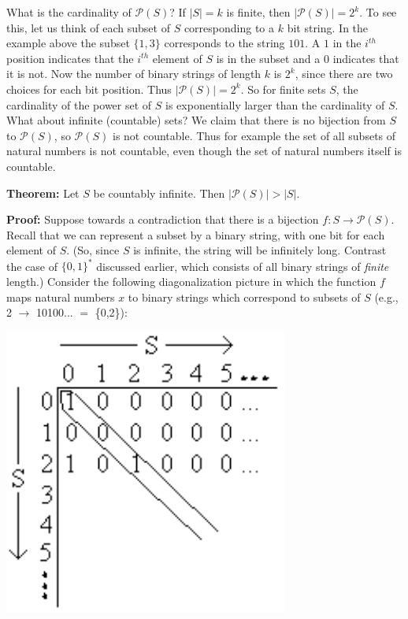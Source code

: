 \documentclass[11pt,fleqn]{article}
\begin{document}
What is the cardinality of $\mathcal{P}(S)$? If $|S|=k$ is finite, 
then $|\mathcal{P}(S)| = 2^k$.
To see this, let us think of each subset of $S$ corresponding to a $k$ bit string. In the 
example above the subset $\{1,3\}$ corresponds to the string $101$. 
A $1$ in the $i^{th}$ position indicates that the $i^{th}$ element 
of $S$ is in the subset and a $0$ indicates that it is not. 
Now the number of binary strings of length $k$ is $2^k$, since 
there are two choices for each bit position. 
Thus $|\mathcal{P}(S)| = 2^{k}$. So for finite sets $S$, the cardinality of 
the power set of $S$ is exponentially larger than the cardinality of $S$. What about 
infinite (countable) sets? We claim that
there is no bijection from $S$ to $\mathcal{P}(S)$, so $\mathcal{P}(S)$ is
not countable.  Thus for example the set of all subsets of natural numbers
is not countable, even though the set of natural numbers itself is countable.

\textbf{Theorem:} Let $S$ be countably infinite.  Then $|\mathcal{P}(S)| > |S|$.

\textbf{Proof:} Suppose towards a contradiction that there is a bijection $f: S
\rightarrow \mathcal{P}(S)$. Recall that we can represent a subset by a binary
string, with one bit for each element of $S$. (So, since $S$ is infinite, the string
will be infinitely long.  Contrast the case of $\{0,1\}^*$ discussed earlier, which
consists of all binary strings of {\it finite\/} length.)  Consider the following
diagonalization picture in which the function $f$ maps natural numbers $x$
to binary strings which correspond to subsets of $S$ (e.g., 2 $\rightarrow$ 10100... $=$ \{0,2\}):

\includegraphics[bb = -40 0 0 170, scale = 0.7]{cantor2}
\end{document}
